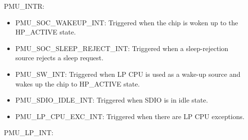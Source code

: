 \documentclass[main\_\_EN.tex]{subfiles}
\begin{document}
PMU\_INTR:

\begin{itemize}
\item \label{int:PMUSOCWAKEUPINT}PMU\_SOC\_WAKEUP\_INT: Triggered when the chip is woken up to the HP\_ACTIVE state.
\item \label{int:PMUSOCSLEEPREJECTINT}PMU\_SOC\_SLEEP\_REJECT\_INT: Triggered when a sleep-rejection source rejects a sleep request.
\item \label{int:PMUSWINT}PMU\_SW\_INT: Triggered when LP CPU is used as a wake-up source and wakes up the chip to HP\_ACTIVE state.

\item \label{int:PMUSDIOIDLEINT}PMU\_SDIO\_IDLE\_INT: Triggered when SDIO is in idle state.
\item \label{int:PMULPCPUEXCINT}PMU\_LP\_CPU\_EXC\_INT: Triggered when there are LP CPU exceptions.
\end{itemize}

PMU\_LP\_INT:
\end{document}
